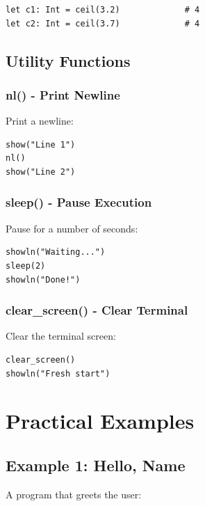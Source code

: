 \documentclass[11pt,twoside,openright]{book}
\begin{document}
\begin{lstlisting}[language=ConstructLang]
let c1: Int = ceil(3.2)             # 4
let c2: Int = ceil(3.7)             # 4
\end{lstlisting}

\section{Utility Functions}

\subsection{nl() - Print Newline}

Print a newline:

\begin{lstlisting}[language=ConstructLang]
show("Line 1")
nl()
show("Line 2")
\end{lstlisting}

\subsection{sleep() - Pause Execution}

Pause for a number of seconds:

\begin{lstlisting}[language=ConstructLang]
showln("Waiting...")
sleep(2)
showln("Done!")
\end{lstlisting}

\subsection{clear\_screen() - Clear Terminal}

Clear the terminal screen:

\begin{lstlisting}[language=ConstructLang]
clear_screen()
showln("Fresh start")
\end{lstlisting}

\chapter{Practical Examples}

\section{Example 1: Hello, Name}

A program that greets the user:
\end{document}
